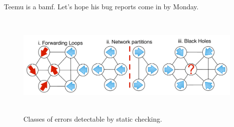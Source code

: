 
Teemu is a bamf. Let's hope his bug reports come in by Monday.

\begin{figure}[t]
    \centering
    \includegraphics[height=2in,width=6in]{../diagrams/bugs/basic_invariants.pdf}
    \caption[]{\label{fig:loop} Classes of errors detectable by static
    checking.\vspace{-10pt}} 
\end{figure}


%

